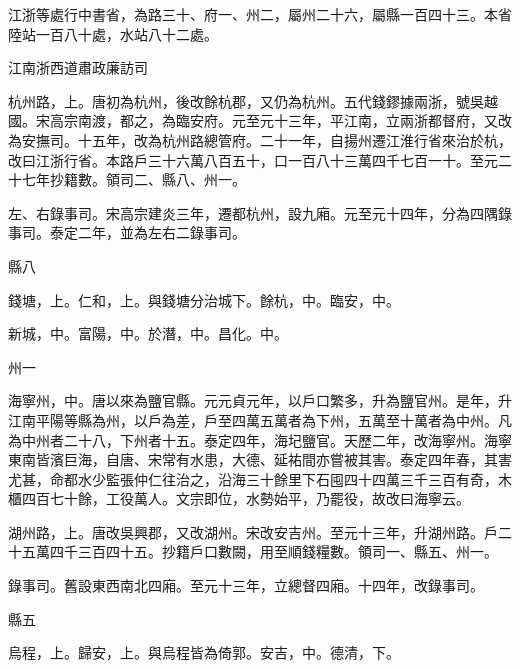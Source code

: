 
\begin{pinyinscope}

 江浙等處行中書省，為路三十、府一、州二，屬州二十六，屬縣一百四十三。本省陸站一百八十處，水站八十二處。



 江南浙西道肅政廉訪司



 杭州路，上。唐初為杭州，後改餘杭郡，又仍為杭州。五代錢鏐據兩浙，號吳越國。宋高宗南渡，都之，為臨安府。元至元十三年，平江南，立兩浙都督府，又改為安撫司。十五年，改為杭州路總管府。二十一年，自揚州遷江淮行省來治於杭，改曰江浙行省。本路戶三十六萬八百五十，口一百八十三萬四千七百一十。至元二十七年抄籍數。領司二、縣八、州一。



 左、右錄事司。宋高宗建炎三年，遷都杭州，設九廂。元至元十四年，分為四隅錄事司。泰定二年，並為左右二錄事司。



 縣八



 錢塘，上。仁和，上。與錢塘分治城下。餘杭，中。臨安，中。



 新城，中。富陽，中。於潛，中。昌化。中。



 州一



 海寧州，中。唐以來為鹽官縣。元元貞元年，以戶口繁多，升為鹽官州。是年，升江南平陽等縣為州，以戶為差，戶至四萬五萬者為下州，五萬至十萬者為中州。凡為中州者二十八，下州者十五。泰定四年，海圮鹽官。天歷二年，改海寧州。海寧東南皆濱巨海，自唐、宋常有水患，大德、延祐間亦嘗被其害。泰定四年春，其害尤甚，命都水少監張仲仁往治之，沿海三十餘里下石囤四十四萬三千三百有奇，木櫃四百七十餘，工役萬人。文宗即位，水勢始平，乃罷役，故改曰海寧云。



 湖州路，上。唐改吳興郡，又改湖州。宋改安吉州。至元十三年，升湖州路。戶二十五萬四千三百四十五。抄籍戶口數闕，用至順錢糧數。領司一、縣五、州一。



 錄事司。舊設東西南北四廂。至元十三年，立總督四廂。十四年，改錄事司。



 縣五



 烏程，上。歸安，上。與烏程皆為倚郭。安吉，中。德清，下。




\end{pinyinscope}
